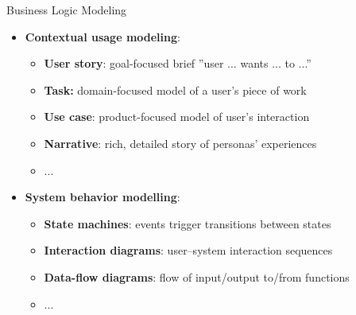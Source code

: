 \begin{Slide}{Business Logic Modeling}
\begin{itemize}
\item \textbf{Contextual usage modeling}:
\begin{itemize}
\item \textbf{User story}: goal-focused brief ''user ... wants ... to ...''
\item \textbf{Task:} domain-focused model of a user's piece of work
\item \textbf{Use case}: product-focused model of user's interaction
\item \textbf{Narrative}: rich, detailed story of personas' experiences
\item ...
\end{itemize}
\item \textbf{System behavior modelling}:
\begin{itemize}
\item \textbf{State machines}: events trigger transitions between states
\item \textbf{Interaction diagrams}: user--system interaction sequences
\item \textbf{Data-flow diagrams}: flow of input/output to/from functions
\item  ...

\end{itemize}
\end{itemize}
\end{Slide}